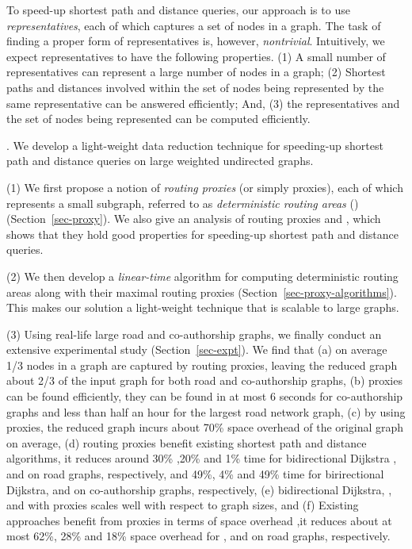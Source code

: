 To speed-up shortest  path and distance queries, our approach is to use {\em representatives}, each of which captures a set of nodes in a graph. The task of finding a proper form of representatives is, however, {\em nontrivial}. Intuitively, we expect representatives to have the following properties.
%
(1) A small number of representatives can represent a large number of nodes in a graph;
%
(2) Shortest paths and distances involved within the set of nodes being represented by the same representative can be answered efficiently; And,
%
(3) the representatives and the set of nodes being represented can be computed efficiently.


. We develop a light-weight data reduction technique for speeding-up shortest  path and distance queries on large weighted undirected graphs.

\stab (1) We first propose a notion of {\em routing proxies} (or simply proxies), each of which represents a small subgraph, referred to as  {\em deterministic routing areas} (\dras)  (Section~\ref{sec-proxy}). We also give an analysis of routing proxies and \dras, which shows that they hold good properties for speeding-up shortest path and distance queries.

\stab (2) We then develop a {\em linear-time} algorithm for computing deterministic routing areas along with their maximal routing proxies (Section~\ref{sec-proxy-algorithms}). This makes our solution a light-weight technique that is scalable to large graphs.


\stab (3) Using real-life large road and co-authorship graphs, we finally conduct an extensive experimental study (Section~\ref{sec-expt}).
We find that (a) on average 1/3 nodes in a graph are captured by routing proxies, leaving the reduced graph about 2/3 of the input graph for both road and co-authorship graphs, (b) proxies can be found efficiently, \eg they can be found in at most 6 seconds for co-authorship graphs and less than half an hour for the largest road network graph, (c) by using proxies, the reduced graph incurs about 70\% space overhead of the original graph on average, (d) routing proxies benefit existing shortest  path and distance algorithms, \eg it reduces around 30\% ,20\% and 1\% time for  bidirectional Dijkstra \cite{LubyR89}, \arcflag \cite{MohringSSWW05} and \ah \cite{zhu2013shortest} on road graphs, respectively, and 49\%, 4\% and 49\% time for birirectional Dijkstra, \arcflag and \tnr \cite{arz2013transit} on co-authorship graphs, respectively, (e) bidirectional Dijkstra, \arcflag, \tnr and \ah with proxies scales well with respect to graph sizes, and (f) Existing approaches benefit from proxies in terms of space overhead ,\eg it reduces about at most 62\%, 28\% and 18\% space overhead for \arcflag, \tnr and \ah on road graphs, respectively.

